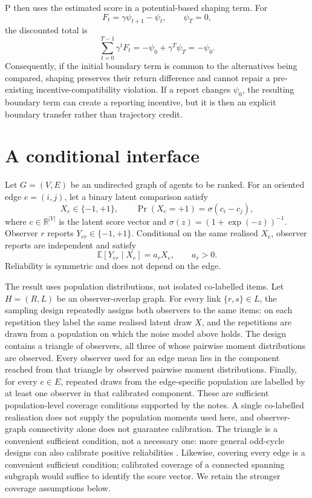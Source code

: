 \documentclass{article}
\begin{document}
P then uses the estimated score in a potential-based shaping term.  For
\[
F_t=\gamma\psi_{t+1}-\psi_t, \qquad \psi_T=0,
\]
the discounted total is
\[
\sum_{t=0}^{T-1}\gamma^tF_t
=-\psi_0+\gamma^T\psi_T=-\psi_0.
\]
Consequently, if the initial boundary term is common to the alternatives being compared, shaping preserves their return difference and cannot repair a pre-existing incentive-compatibility violation. %
If a report changes $\psi_0$, the resulting boundary term can create a reporting incentive, but it is then an explicit boundary transfer rather than trajectory credit. %

\section{A conditional interface}

Let $G=(V,E)$ be an undirected graph of agents to be ranked.  For an oriented edge $e=(i,j)$, let a binary latent comparison satisfy
\[
X_e\in\{-1,+1\},\qquad
\Pr(X_e=+1)=\sigma(c_i-c_j),
\]
where $c\in\mathbb{R}^{|V|}$ is the latent score vector and $\sigma(z)=(1+\exp(-z))^{-1}$. %
Observer $r$ reports $Y_{er}\in\{-1,+1\}$.  Conditional on the same realised $X_e$, observer reports are independent and satisfy
\[
\mathbb{E}[Y_{er}\mid X_e]=a_rX_e,\qquad a_r>0.
\]
Reliability is symmetric and does not depend on the edge. %

The result uses population distributions, not isolated co-labelled items.  Let $H=(R,L)$ be an observer-overlap graph.  For every link $\{r,s\}\in L$, the sampling design repeatedly assigns both observers to the same items: on each repetition they label the same realised latent draw $X$, and the repetitions are drawn from a population on which the noise model above holds.  The design contains a triangle of observers, all three of whose pairwise moment distributions are observed.  Every observer used for an edge mean lies in the component reached from that triangle by observed pairwise moment distributions.  Finally, for every $e\in E$, repeated draws from the edge-specific population are labelled by at least one observer in that calibrated component.  These are sufficient population-level coverage conditions supported by the notes.  A single co-labelled realisation does not supply the population moments used here, and observer-graph connectivity alone does not guarantee calibration.  The triangle is a convenient sufficient condition, not a necessary one: more general odd-cycle designs can also calibrate positive reliabilities \cite{ma2017crowdsourcing,ma2019gradient}.  Likewise, covering every edge is a convenient sufficient condition; calibrated coverage of a connected spanning subgraph would suffice to identify the score vector.  We retain the stronger coverage assumptions below. %
\end{document}
